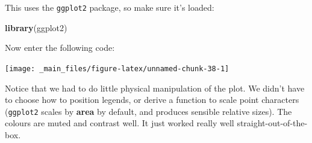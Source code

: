 \documentclass[]{book}
\newenvironment{Shaded}{\begin{snugshade}}{\end{snugshade}}
\newcommand{\KeywordTok}[1]{\textcolor[rgb]{0.13,0.29,0.53}{\textbf{{#1}}}}
\newcommand{\DataTypeTok}[1]{\textcolor[rgb]{0.13,0.29,0.53}{{#1}}}
\newcommand{\DecValTok}[1]{\textcolor[rgb]{0.00,0.00,0.81}{{#1}}}
\newcommand{\StringTok}[1]{\textcolor[rgb]{0.31,0.60,0.02}{{#1}}}
\newcommand{\NormalTok}[1]{{#1}}
\theoremstyle{definition}
\theoremstyle{definition}
\theoremstyle{definition}
\theoremstyle{remark}
\begin{document}
This uses the \texttt{ggplot2} package, so make sure it's loaded:

\begin{Shaded}
\begin{Highlighting}[]
\KeywordTok{library}\NormalTok{(ggplot2)}
\end{Highlighting}
\end{Shaded}

Now enter the following code:

\begin{Shaded}
\end{Shaded}

\begin{center}\texttt{[image: \_main\_files/figure-latex/unnamed-chunk-38-1]} \end{center}

Notice that we had to do little physical manipulation of the plot. We
didn't have to choose how to position legends, or derive a function to
scale point characters (\texttt{ggplot2} scales by \textbf{area} by
default, and produces sensible relative sizes). The colours are muted
and contrast well. It just worked really well straight-out-of-the-box.
\end{document}
